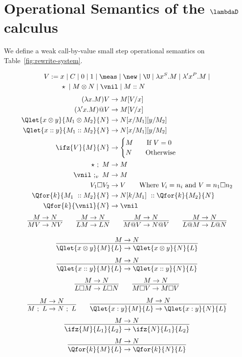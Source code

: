 \section{Operational Semantics of the \texorpdfstring{$\lambdaD$}{lambda sub D} calculus}%
\label{sec:op-semantics}

We define a weak call-by-value small step operational semantics on Table~\ref{fig:rewrite-system}. 
\begin{table}[htbp]
    \begin{align*}
        V :=\; & x \;|\; C \;|\; 0 \;|\; 1 \;|\; \meas \;|\; \new \;|\; \U \;|\; \lambda x^S. M \;|\; \lambda' x^P. M \;|\\
        & \star \;|\; M \otimes N \;|\;  \vnil \;|\; M :: N \;
    \end{align*}
    \begin{align*}
        (\lambda x.M)V &\to M[V/x]\\
        (\lambda' x.M)@V &\to M[V/x]\\
        \Qlet{x\otimes y}{M_1\otimes M_2}{N}&\to N[x/M_1][y/M_2]\\
        \Qlet{x::y}{M_1 :: M_2}{N}&\to N[x/M_1][y/M_2]\\
        \ifz{V}{M}{N}&\to 
        \begin{cases}
            M\qquad\text{If } V=0 \\ 
            N\qquad\text{Otherwise}
        \end{cases}\\
        \star\ ;\ M &\to M\\
        \vnil\ ;_v\ M &\to M\\
        V_1 \square V_2 &\to V\qquad\text{Where }V_i = n_i\text{ and }V=n_1\square n_2\\
        \Qfor{k}{M_1\ :: M_2}{N} &\to N[k/M_1]\ :: \Qfor{k}{M_2}{N}\\
        \Qfor{k}{\vnil}{N} &\to \vnil
    \end{align*}
    \[
      \infer{MV\to NV}{M\to N}
      \qquad 
      \infer{LM\to LN}{M\to N}
      \qquad
      \infer{M@V\to N@V}{M\to N}
      \qquad 
      \infer{L@M\to L@N}{M\to N}
    \]

    \[
      \infer{\Qlet{x\otimes y}{M}{L}\to \Qlet{x\otimes y}{N}{L}}{M\to N}
    \]
    \[
      \infer{\Qlet{x:: y}{M}{L}\to \Qlet{x:: y}{N}{L}}{M\to N}
    \]
    \[
      \infer{L\square M\to L\square N}{M\to N}
      \qquad
      \infer{M\square V\to M\square V}{M\to N}
    \]
    \[
      \infer{M\ ;\  L\to N\ ;\ L}{M\to N}
      \qquad
      \infer{\Qlet{x: y}{M}{L}\to \Qlet{x: y}{N}{L}}{M\to N}
    \]
    \[
      \infer{\ifz{M}{L_1}{L_2}\to\ifz{N}{L_1}{L_2}}{M\to N}
    \]
    \[
      \infer{\Qfor{k}{M}{L}\to\Qfor{k}{N}{L}}{M\to N}
    \]
    \caption{Rewrite system for $\lambdaD$.}
    \label{fig:rewrite-system}
\end{table}

